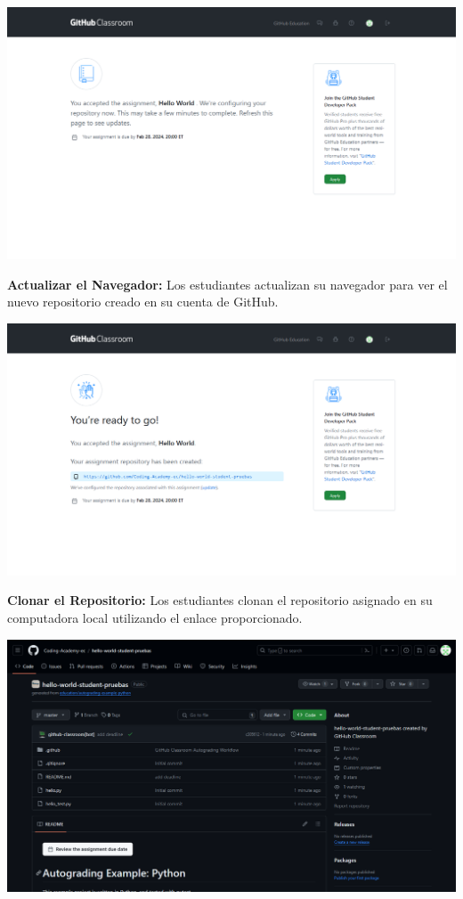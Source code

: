 \documentclass[
  a4paper,
  DIV=11,
  numbers=noendperiod,
  onepage,
  openany]{scrreprt}
\begin{document}
\begin{center}
\includegraphics{unidades/unidad1/images/paste-6.png}
\end{center}

\textbf{Actualizar el Navegador:} Los estudiantes actualizan su
navegador para ver el nuevo repositorio creado en su cuenta de GitHub.

\begin{center}
\includegraphics{unidades/unidad1/images/paste-8.png}
\end{center}

\textbf{Clonar el Repositorio:} Los estudiantes clonan el repositorio
asignado en su computadora local utilizando el enlace proporcionado.

\begin{center}
\includegraphics{unidades/unidad1/images/paste-9.png}
\end{center}
\end{document}
